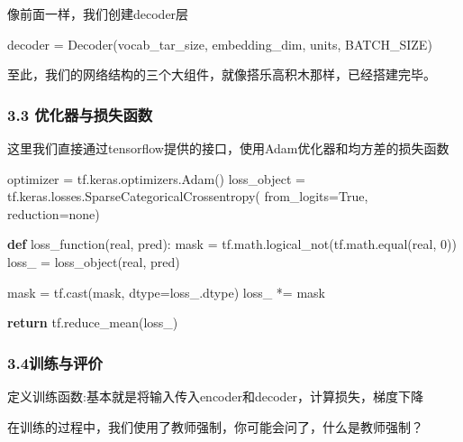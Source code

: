 \documentclass[
]{article}
\newenvironment{Shaded}{}{}
\newcommand{\ControlFlowTok}[1]{\textcolor[rgb]{0.00,0.44,0.13}{\textbf{#1}}}
\newcommand{\DecValTok}[1]{\textcolor[rgb]{0.25,0.63,0.44}{#1}}
\newcommand{\KeywordTok}[1]{\textcolor[rgb]{0.00,0.44,0.13}{\textbf{#1}}}
\newcommand{\NormalTok}[1]{#1}
\newcommand{\OperatorTok}[1]{\textcolor[rgb]{0.40,0.40,0.40}{#1}}
\newcommand{\StringTok}[1]{\textcolor[rgb]{0.25,0.44,0.63}{#1}}
\newcommand{\VariableTok}[1]{\textcolor[rgb]{0.10,0.09,0.49}{#1}}
\begin{document}
像前面一样，我们创建decoder层

\begin{Shaded}
\begin{Highlighting}[]
\NormalTok{decoder }\OperatorTok{=}\NormalTok{ Decoder(vocab\_tar\_size, embedding\_dim, units, BATCH\_SIZE)}
\end{Highlighting}
\end{Shaded}

至此，我们的网络结构的三个大组件，就像搭乐高积木那样，已经搭建完毕。

\hypertarget{header-n138}{%
\subsubsection{3.3 优化器与损失函数}\label{header-n138}}

这里我们直接通过tensorflow提供的接口，使用Adam优化器和均方差的损失函数

\begin{Shaded}
\begin{Highlighting}[]
\NormalTok{optimizer }\OperatorTok{=}\NormalTok{ tf.keras.optimizers.Adam()}
\NormalTok{loss\_object }\OperatorTok{=}\NormalTok{ tf.keras.losses.SparseCategoricalCrossentropy(}
\NormalTok{    from\_logits}\OperatorTok{=}\VariableTok{True}\NormalTok{, reduction}\OperatorTok{=}\StringTok{\textquotesingle{}none\textquotesingle{}}\NormalTok{)}

\KeywordTok{def}\NormalTok{ loss\_function(real, pred):}
\NormalTok{    mask }\OperatorTok{=}\NormalTok{ tf.math.logical\_not(tf.math.equal(real, }\DecValTok{0}\NormalTok{))}
\NormalTok{    loss\_ }\OperatorTok{=}\NormalTok{ loss\_object(real, pred)}

\NormalTok{    mask }\OperatorTok{=}\NormalTok{ tf.cast(mask, dtype}\OperatorTok{=}\NormalTok{loss\_.dtype)}
\NormalTok{    loss\_ }\OperatorTok{*=}\NormalTok{ mask}

    \ControlFlowTok{return}\NormalTok{ tf.reduce\_mean(loss\_)}
\end{Highlighting}
\end{Shaded}

\hypertarget{header-n141}{%
\subsubsection{3.4训练与评价}\label{header-n141}}

定义训练函数:基本就是将输入传入encoder和decoder，计算损失，梯度下降

在训练的过程中，我们使用了教师强制，你可能会问了，什么是教师强制？
\end{document}
